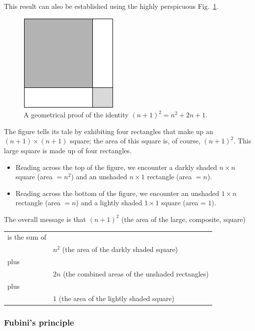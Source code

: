 This result can also be established using the highly perspicuous
Fig.~\ref{fig:proofa2plusb2}.
\begin{figure}[ht]
\begin{center}
       \includegraphics[scale=0.4]{FiguresMaths/proofa2plusb2}
\caption{A geometrical proof of the identity $(n+1)^2 = n^2 + 2n + 1$.}
       \label{fig:proofa2plusb2}
\end{center}
\end{figure}
The figure tells its tale by exhibiting four rectangles that make up
an $(n+1) \times (n+1)$ square; the area of this square is, of course,
$(n+1)^2$.  This large square is made up of four rectangles.
\begin{itemize}
\item
Reading across the top of the figure, we encounter a darkly shaded $n
\times n$ square (area $= n^2$) and an unshaded $n \times 1$ rectangle
(area $= n$).
\item
Reading across the bottom of the figure, we encounter an unshaded $1
\times n$ rectangle (area $= n$) and a lightly shaded $1 \times 1$
square (area = $1$).
\end{itemize}
The overall message is that $(n+1)^2$ (the area of the large,
composite, square)

\begin{tabular}{ll}
is the sum of & \\
  & $n^2$ (the area of the darkly shaded square) \\
plus & \\
  & $2n$ (the combined areas of the unshaded rectangles) \\
plus & \\
  & $1$ (the area of the lightly shaded square)
\end{tabular}


\subsubsection{Fubini's principle}
\label{sec:Fubini}


